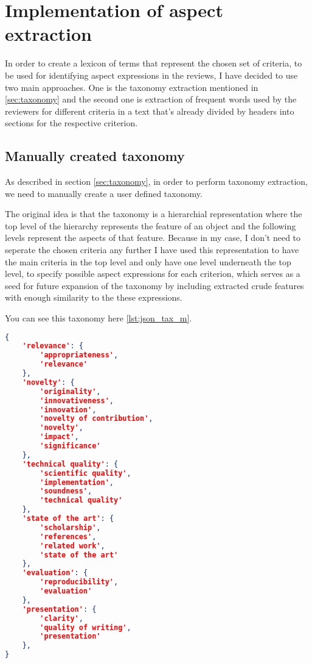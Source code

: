 \chapter{Implementation of aspect extraction}
In order to create a lexicon of terms that represent the chosen set of criteria, to be used for identifying aspect expressions in the reviews, I have decided to use two main approaches. One is the taxonomy extraction mentioned in \ref{sec:taxonomy} and the second one is extraction of frequent words used by the reviewers for different criteria in a text that's already divided by headers into sections for the respective criterion.
\section{Manually created taxonomy}
As described in section \ref{sec:taxonomy}, in order to perform taxonomy extraction, we need to manually
create a user defined taxonomy. 

The original idea is that the taxonomy is a hierarchial representation where the top level of the hierarchy represents the feature of an object and the following levels represent the aspects of that feature. Because in my case, I don't need to seperate the chosen criteria any further I have used this representation to have the main criteria in the top level and only have one level underneath the top level, to specify possible aspect expressions for each criterion, which serves as a seed for future expansion of the taxonomy by including extracted crude features with enough similarity to the these expressions. 

You can see this taxonomy here \ref{lst:json_tax_m}.

\begin{lstlisting}[language=json,firstnumber=1, caption={Manually created taxonomy for aspect extraction},label={lst:json_tax_m},float,floatplacement=H]
{
    'relevance': {
        'appropriateness',
        'relevance'
    },
    'novelty': {
        'originality',
        'innovativeness',
        'innovation',
        'novelty of contribution',
        'novelty',
        'impact',
        'significance'
    },
    'technical quality': {
        'scientific quality',
        'implementation',
        'soundness',
        'technical quality'
    },
    'state of the art': {
        'scholarship',
        'references',
        'related work',
        'state of the art'
    },
    'evaluation': {
        'reproducibility',
        'evaluation'
    },
    'presentation': {
        'clarity',
        'quality of writing',
        'presentation'
    },
}
\end{lstlisting}
